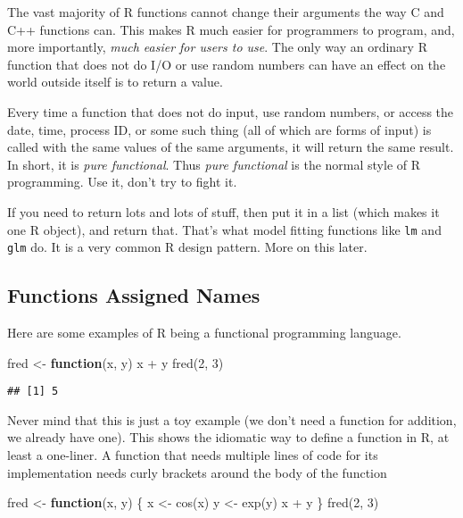 \documentclass[
]{article}
\newenvironment{Shaded}{\begin{snugshade}}{\end{snugshade}}
\newcommand{\ControlFlowTok}[1]{\textcolor[rgb]{0.13,0.29,0.53}{\textbf{#1}}}
\newcommand{\DecValTok}[1]{\textcolor[rgb]{0.00,0.00,0.81}{#1}}
\newcommand{\FunctionTok}[1]{\textcolor[rgb]{0.00,0.00,0.00}{#1}}
\newcommand{\NormalTok}[1]{#1}
\newcommand{\OtherTok}[1]{\textcolor[rgb]{0.56,0.35,0.01}{#1}}
\newcommand{\SpecialCharTok}[1]{\textcolor[rgb]{0.00,0.00,0.00}{#1}}
\begin{document}
The vast majority of R functions cannot change their arguments the way C
and C++ functions can. This makes R much easier for programmers to
program, and, more importantly, \emph{much easier for users to use}. The
only way an ordinary R function that does not do I/O or use random
numbers can have an effect on the world outside itself is to return a
value.

Every time a function that does not do input, use random numbers, or
access the date, time, process ID, or some such thing (all of which are
forms of input) is called with the same values of the same arguments, it
will return the same result. In short, it is \emph{pure functional}.
Thus \emph{pure functional} is the normal style of R programming. Use
it, don't try to fight it.

If you need to return lots and lots of stuff, then put it in a list
(which makes it one R object), and return that. That's what model
fitting functions like \texttt{lm} and \texttt{glm} do. It is a very
common R design pattern. More on this later.

\hypertarget{functions-assigned-names}{%
\subsection{Functions Assigned Names}\label{functions-assigned-names}}

Here are some examples of R being a functional programming language.

\begin{Shaded}
\begin{Highlighting}[]
\NormalTok{fred }\OtherTok{\textless{}{-}} \ControlFlowTok{function}\NormalTok{(x, y) x }\SpecialCharTok{+}\NormalTok{ y}
\FunctionTok{fred}\NormalTok{(}\DecValTok{2}\NormalTok{, }\DecValTok{3}\NormalTok{)}
\end{Highlighting}
\end{Shaded}

\begin{verbatim}
## [1] 5
\end{verbatim}

Never mind that this is just a toy example (we don't need a function for
addition, we already have one). This shows the idiomatic way to define a
function in R, at least a one-liner. A function that needs multiple
lines of code for its implementation needs curly brackets around the
body of the function

\begin{Shaded}
\begin{Highlighting}[]
\NormalTok{fred }\OtherTok{\textless{}{-}} \ControlFlowTok{function}\NormalTok{(x, y) \{}
\NormalTok{   x }\OtherTok{\textless{}{-}} \FunctionTok{cos}\NormalTok{(x)}
\NormalTok{   y }\OtherTok{\textless{}{-}} \FunctionTok{exp}\NormalTok{(y)}
\NormalTok{   x }\SpecialCharTok{+}\NormalTok{ y}
\NormalTok{\}}
\FunctionTok{fred}\NormalTok{(}\DecValTok{2}\NormalTok{, }\DecValTok{3}\NormalTok{)}
\end{Highlighting}
\end{Shaded}
\end{document}
